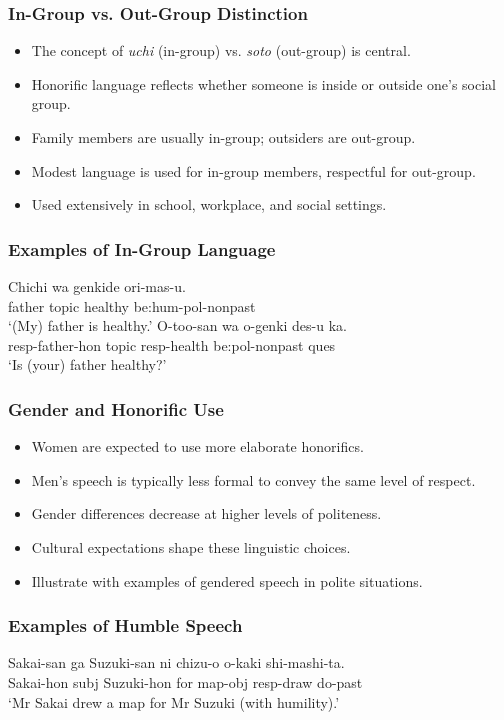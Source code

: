 \documentclass[xetex]{beamer}
\begin{document}
\begin{frame}
\frametitle{In-Group vs. Out-Group Distinction}
\begin{itemize}
    \item The concept of \textit{uchi} (in-group) vs. \textit{soto} (out-group) is central.
    \item Honorific language reflects whether someone is inside or outside one’s social group.
    \item Family members are usually in-group; outsiders are out-group.
    \item Modest language is used for in-group members, respectful for out-group.
    \item Used extensively in school, workplace, and social settings.
\end{itemize}
\end{frame}

\begin{frame}
\frametitle{Examples of In-Group Language}
\begin{exe}
    \ex \gll Chichi wa genkide ori-mas-u. \\
        father topic healthy be:hum-pol-nonpast \\
        \trans ‘(My) father is healthy.’
    \ex \gll O-too-san wa o-genki des-u ka. \\
        resp-father-hon topic resp-health be:pol-nonpast ques \\
        \trans ‘Is (your) father healthy?’
\end{exe}
\end{frame}

\begin{frame}
\frametitle{Gender and Honorific Use}
\begin{itemize}
    \item Women are expected to use more elaborate honorifics.
    \item Men’s speech is typically less formal to convey the same level of respect.
    \item Gender differences decrease at higher levels of politeness.
    \item Cultural expectations shape these linguistic choices.
    \item Illustrate with examples of gendered speech in polite situations.
\end{itemize}
\end{frame}

\begin{frame}
\frametitle{Examples of Humble Speech}
\begin{exe}
    \ex \gll Sakai-san ga Suzuki-san ni chizu-o o-kaki shi-mashi-ta. \\
        Sakai-hon subj Suzuki-hon for map-obj resp-draw do-past \\
        \trans ‘Mr Sakai drew a map for Mr Suzuki (with humility).’
\end{exe}
\end{frame}
\end{document}
